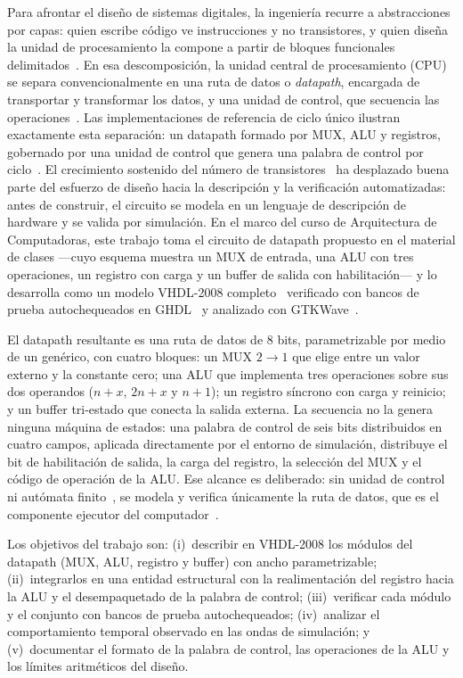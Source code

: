 \documentclass[llncs]{llncs}
\begin{document}
Para afrontar el diseño de sistemas digitales, la ingeniería recurre a
abstracciones por capas: quien escribe código ve instrucciones y no
transistores, y quien diseña la unidad de procesamiento la compone a partir
de bloques funcionales delimitados~\cite{patterson2017cod}. En esa
descomposición, la unidad central de procesamiento (CPU) se separa
convencionalmente en una ruta de datos o \emph{datapath}, encargada de
transportar y transformar los datos, y una unidad de control, que secuencia
las operaciones~\cite{hamacher2002co}. Las implementaciones de referencia de
ciclo único ilustran exactamente esta separación: un datapath formado por
MUX, ALU y registros, gobernado por una unidad de control que genera una
palabra de control por ciclo~\cite{patterson2017cod,bryant2015csapp}.
El crecimiento sostenido del número de transistores~\cite{hennessy2017qa} ha
desplazado buena parte del esfuerzo de diseño hacia la descripción y la
verificación automatizadas: antes de construir, el circuito se modela en un
lenguaje de descripción de hardware y se valida por simulación. En el marco
del curso de Arquitectura de Computadoras, este trabajo toma el circuito de
datapath propuesto en el material de clases ---cuyo esquema muestra un MUX
de entrada, una ALU con tres operaciones, un registro con carga y un buffer
de salida con habilitación--- y lo desarrolla como un modelo VHDL-2008
completo~\cite{ieee1076_2008} verificado con bancos de prueba
autochequeados en GHDL~\cite{ghdl-docs} y analizado con
GTKWave~\cite{gtkwave-docs}.

El datapath resultante es una ruta de datos de 8 bits, parametrizable por
medio de un genérico, con cuatro bloques: un MUX $2\to1$ que elige entre un
valor externo y la constante cero; una ALU que implementa tres operaciones
sobre sus dos operandos ($n+x$, $2n+x$ y $n+1$); un registro síncrono con
carga y reinicio; y un buffer tri-estado que conecta la salida externa. La
secuencia no la genera ninguna máquina de estados: una palabra de control de
seis bits distribuidos en cuatro campos, aplicada directamente por el
entorno de simulación, distribuye
el bit de habilitación de salida, la carga del registro, la selección del
MUX y el código de operación de la ALU. Ese alcance es deliberado: sin
unidad de control ni autómata finito~\cite{mano2016lcdf}, se modela y verifica
únicamente la ruta de datos, que es el componente ejecutor del
computador~\cite{hamacher2002co}.

Los objetivos del trabajo son: (i)~describir en VHDL-2008 los módulos del
datapath (MUX, ALU, registro y buffer) con ancho parametrizable;
(ii)~integrarlos en una entidad estructural con la realimentación del
registro hacia la ALU y el desempaquetado de la palabra de control;
(iii)~verificar cada módulo y el conjunto con bancos de prueba
autochequeados; (iv)~analizar el comportamiento temporal observado en las
ondas de simulación; y (v)~documentar el formato de la palabra de control,
las operaciones de la ALU y los límites aritméticos del diseño.
\end{document}
